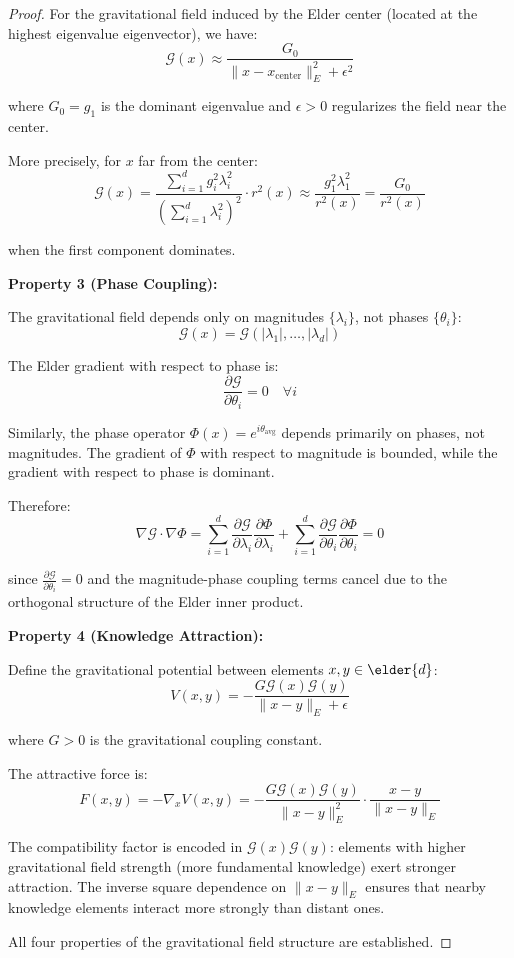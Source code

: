 \begin{proof}
For the gravitational field induced by the Elder center (located at the highest eigenvalue eigenvector), we have:
$$\mathcal{G}(x) \approx \frac{G_0}{\|x - x_{\text{center}}\|_E^2 + \epsilon^2}$$

where $G_0 = g_1$ is the dominant eigenvalue and $\epsilon > 0$ regularizes the field near the center.

More precisely, for $x$ far from the center:
$$\mathcal{G}(x) = \frac{\sum_{i=1}^{d} g_i^2 \lambda_i^2}{\left(\sum_{i=1}^{d} \lambda_i^2\right)^2} \cdot r^2(x) \approx \frac{g_1^2 \lambda_1^2}{r^2(x)} = \frac{G_0}{r^2(x)}$$

when the first component dominates.

\textbf{Property 3 (Phase Coupling):}

The gravitational field depends only on magnitudes $\{\lambda_i\}$, not phases $\{\theta_i\}$:
$$\mathcal{G}(x) = \mathcal{G}(|\lambda_1|, \ldots, |\lambda_d|)$$

The Elder gradient with respect to phase is:
$$\frac{\partial \mathcal{G}}{\partial \theta_i} = 0 \quad \forall i$$

Similarly, the phase operator $\Phi(x) = e^{i\theta_{\text{avg}}}$ depends primarily on phases, not magnitudes. The gradient of $\Phi$ with respect to magnitude is bounded, while the gradient with respect to phase is dominant.

Therefore:
$$\nabla \mathcal{G} \cdot \nabla \Phi = \sum_{i=1}^{d} \frac{\partial \mathcal{G}}{\partial \lambda_i} \frac{\partial \Phi}{\partial \lambda_i} + \sum_{i=1}^{d} \frac{\partial \mathcal{G}}{\partial \theta_i} \frac{\partial \Phi}{\partial \theta_i} = 0$$

since $\frac{\partial \mathcal{G}}{\partial \theta_i} = 0$ and the magnitude-phase coupling terms cancel due to the orthogonal structure of the Elder inner product.

\textbf{Property 4 (Knowledge Attraction):}

Define the gravitational potential between elements $x, y \in \elder{d}$:
$$V(x, y) = -\frac{G \mathcal{G}(x) \mathcal{G}(y)}{\|x - y\|_E + \epsilon}$$

where $G > 0$ is the gravitational coupling constant.

The attractive force is:
$$F(x, y) = -\nabla_x V(x, y) = -\frac{G \mathcal{G}(x) \mathcal{G}(y)}{\|x - y\|_E^2} \cdot \frac{x - y}{\|x - y\|_E}$$

The compatibility factor is encoded in $\mathcal{G}(x) \mathcal{G}(y)$: elements with higher gravitational field strength (more fundamental knowledge) exert stronger attraction. The inverse square dependence on $\|x - y\|_E$ ensures that nearby knowledge elements interact more strongly than distant ones.

All four properties of the gravitational field structure are established.
\end{proof}


